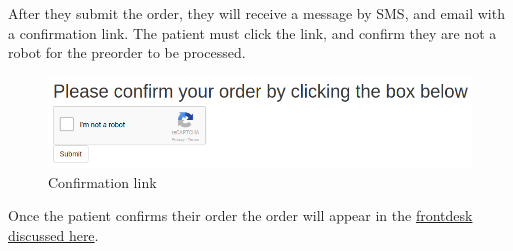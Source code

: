 \documentclass[]{book}
\theoremstyle{definition}
\theoremstyle{definition}
\theoremstyle{definition}
\theoremstyle{remark}
\begin{document}
After they submit the order, they will receive a message by SMS, and
email with a confirmation link. The patient must click the link, and
confirm they are not a robot for the preorder to be processed.

\begin{figure}
\centering
\includegraphics{images/M11.png}
\caption{Confirmation link}
\end{figure}

Once the patient confirms their order the order will appear in the
\href{frontdesk.html\#online-orders}{frontdesk discussed here}.
\end{document}
